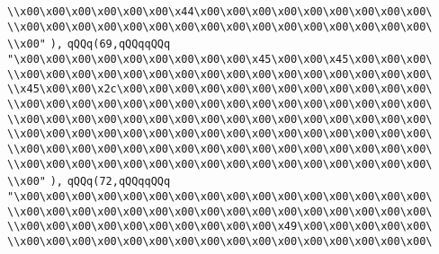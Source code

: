 \verb|\\x00\x00\x00\x00\x00\x00\x44\x00\x00\x00\x00\x00\x00\x00\x00\x00\|\newline
\verb|\\x00\x00\x00\x00\x00\x00\x00\x00\x00\x00\x00\x00\x00\x00\x00\x00\|\newline
\verb|\\x00"|\newline
\verb|),|\newline
\verb|qQQq(69,qQQqqQQq|\newline
\verb|"\x00\x00\x00\x00\x00\x00\x00\x00\x00\x45\x00\x00\x45\x00\x00\x00\|\newline
\verb|\\x00\x00\x00\x00\x00\x00\x00\x00\x00\x00\x00\x00\x00\x00\x00\x00\|\newline
\verb|\\x45\x00\x00\x2c\x00\x00\x00\x00\x00\x00\x00\x00\x00\x00\x00\x00\|\newline
\verb|\\x00\x00\x00\x00\x00\x00\x00\x00\x00\x00\x00\x00\x00\x00\x00\x00\|\newline
\verb|\\x00\x00\x00\x00\x00\x00\x00\x00\x00\x00\x00\x00\x00\x00\x00\x00\|\newline
\verb|\\x00\x00\x00\x00\x00\x00\x00\x00\x00\x00\x00\x00\x00\x00\x00\x00\|\newline
\verb|\\x00\x00\x00\x00\x00\x00\x00\x00\x00\x00\x00\x00\x00\x00\x00\x00\|\newline
\verb|\\x00\x00\x00\x00\x00\x00\x00\x00\x00\x00\x00\x00\x00\x00\x00\x00\|\newline
\verb|\\x00"|\newline
\verb|),|\newline
\verb|qQQq(72,qQQqqQQq|\newline
\verb|"\x00\x00\x00\x00\x00\x00\x00\x00\x00\x00\x00\x00\x00\x00\x00\x00\|\newline
\verb|\\x00\x00\x00\x00\x00\x00\x00\x00\x00\x00\x00\x00\x00\x00\x00\x00\|\newline
\verb|\\x00\x00\x00\x00\x00\x00\x00\x00\x00\x00\x49\x00\x00\x00\x00\x00\|\newline
\verb|\\x00\x00\x00\x00\x00\x00\x00\x00\x00\x00\x00\x00\x00\x00\x00\x00\|\newline
